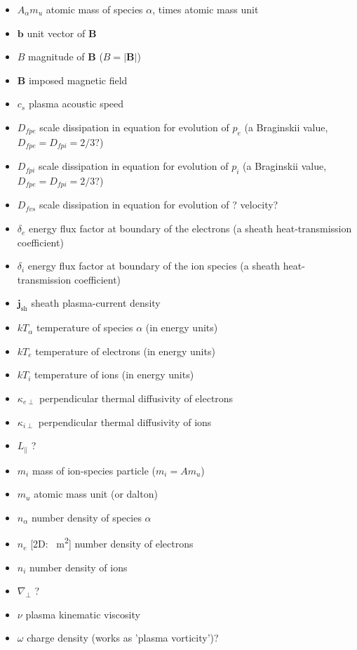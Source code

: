 \documentclass{article}
\begin{document}
\begin{itemize}
    \item $A_\alpha m_u$ atomic mass of species $\alpha$, times atomic mass unit
    \item $\bm{b}$ unit vector of $\bm{B}$
    \item $B$ magnitude of $\bm{B}$ ($B = |\bm{B}|$)
    \item $\bm{B}$ imposed magnetic field
    \item $c_s$ plasma acoustic speed
    \item $D_{fpe}$ scale dissipation in equation for evolution of $p_e$ (a Braginskii value, $D_{fpe} = D_{fpi} = 2/3$?)
    \item $D_{fpi}$ scale dissipation in equation for evolution of $p_i$ (a Braginskii value, $D_{fpe} = D_{fpi} = 2/3$?)
    \item $D_{fvs}$ scale dissipation in equation for evolution of ? velocity?
    \item $\delta_e$ energy flux factor at boundary of the electrons (a sheath heat-transmission coefficient)
    \item $\delta_i$ energy flux factor at boundary of the ion species (a sheath heat-transmission coefficient)
    \item $\bm{j}_\text{sh}$ sheath plasma-current density
    \item $kT_\alpha$ temperature of species $\alpha$ (in energy units)
    \item $kT_e$ temperature of electrons (in energy units)
    \item $kT_i$ temperature of ions (in energy units)
    \item $\kappa_{e\perp}$ perpendicular thermal diffusivity of electrons
    \item $\kappa_{i\perp}$ perpendicular thermal diffusivity of ions
    \item $L_\parallel$ ?
    \item $m_i$ mass of ion-species particle ($m_i = Am_u$)
    \item $m_u$ atomic mass unit (or dalton)
    \item $n_\alpha$ number density of species $\alpha$
    \item $n_e$ [2D: \unit{\per\square\metre}] number density of electrons
    \item $n_i$ number density of ions
    \item $\nabla_\perp$ ?
    \item $\nu$ plasma kinematic viscosity
    \item $\omega$ charge density (works as 'plasma vorticity')?

\end{itemize}
\end{document}
